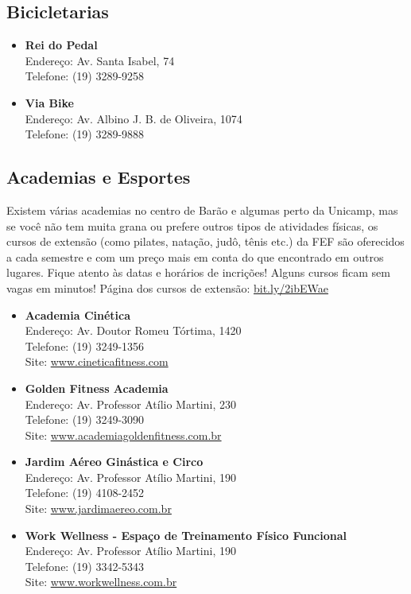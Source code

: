 \subsection{Bicicletarias}

\begin{itemize}
\item \textbf{Rei do Pedal}
  \\Endereço: Av. Santa Isabel, 74
  \\Telefone: (19) 3289-9258

\item \textbf{Via Bike}
  \\Endereço: Av. Albino J. B. de Oliveira, 1074
  \\Telefone: (19) 3289-9888
\end{itemize}

\subsection{Academias e Esportes}

Existem várias academias no centro de Barão e algumas perto da Unicamp, mas se
você não tem muita grana ou prefere outros tipos de atividades físicas, os
cursos de extensão (como pilates, natação, judô, tênis etc.) da FEF são
oferecidos a cada semestre e com um preço mais em conta do que encontrado em
outros lugares. Fique atento às datas e horários de incrições! Alguns cursos
ficam sem vagas em minutos! Página dos cursos de extensão: \url{bit.ly/2ibEWae}

\begin{itemize}
\item \textbf{Academia Cinética}
  \\Endereço: Av. Doutor Romeu Tórtima, 1420
  \\Telefone: (19) 3249-1356
  \\Site: \url{www.cineticafitness.com}

\item \textbf{Golden Fitness Academia}
  \\Endereço: Av. Professor Atílio Martini, 230
  \\Telefone: (19) 3249-3090
  \\Site: \url{www.academiagoldenfitness.com.br}

\item \textbf{Jardim Aéreo Ginástica e Circo}
  \\Endereço: Av. Professor Atílio Martini, 190
  \\Telefone: (19) 4108-2452
  \\Site: \url{www.jardimaereo.com.br}

\item \textbf{Work Wellness - Espaço de Treinamento Físico Funcional}
  \\Endereço: Av. Professor Atílio Martini, 190
  \\Telefone: (19) 3342-5343
  \\Site: \url{www.workwellness.com.br}
\end{itemize}

